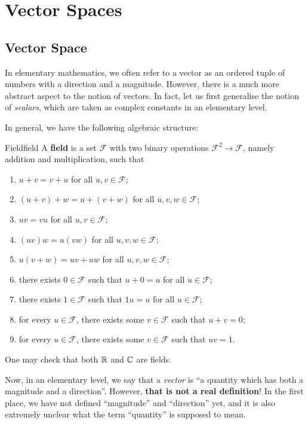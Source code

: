 \documentclass[math, code]{amznotes}
\theoremstyle{remark}
\begin{document}
\tableofcontents

\chapter{Vector Spaces}
\section{Vector Space}
In elementary mathematics, we often refer to a vector as an ordered tuple of numbers with a direction and a magnitude. However, there is a much more abstract aspect to the notion of vectors. In fact, let us first generalise the notion of \textit{scalars}, which are taken as complex constants in an elementary level. 

In general, we have the following algebraic structure:
\begin{dfnbox}{Field}{field}
    A {\color{red} \textbf{field}} is a set $\mathcal{F}$ with two binary operations $\mathcal{F}^2 \to \mathcal{F}$, namely addition and multiplication, such that
    \begin{enumerate}
        \item $u + v = v + u$ for all $u, v \in \mathcal{F}$;
        \item $(u + v) + w = u + (v + w)$ for all $u, v, w \in \mathcal{F}$;
        \item $uv = vu$ for all $u, v \in \mathcal{F}$;
        \item $(uv)w = u(vw)$ for all $u, v, w \in \mathcal{F}$;
        \item $u(v + w) = uv + uw$ for all $u, v, w \in \mathcal{F}$;
        \item there exists $0 \in \mathcal{F}$ such that $u + 0 = u$ for all $u \in \mathcal{F}$;
        \item there exists $1 \in \mathcal{F}$ such that $1u = u$ for all $u \in \mathcal{F}$;
        \item for every $u \in \mathcal{F}$, there exists some $v \in \mathcal{F}$ such that $u + v = 0$;
        \item for every $u \in \mathcal{F}$, there exists some $v \in \mathcal{F}$ such that $uv = 1$.
    \end{enumerate}
\end{dfnbox}
One may check that both $\mathbb{R}$ and $\mathbb{C}$ are fields. 

Now, in an elementary level, we say that a \textit{vector} is ``a quantity which has both a magnitude and a direction''. However, \textbf{that is not a real definition}! In the first place, we have not defined ``magnitude'' and ``direction'' yet, and it is also extremely unclear what the term ``quantity'' is supposed to mean. 
\end{document}
